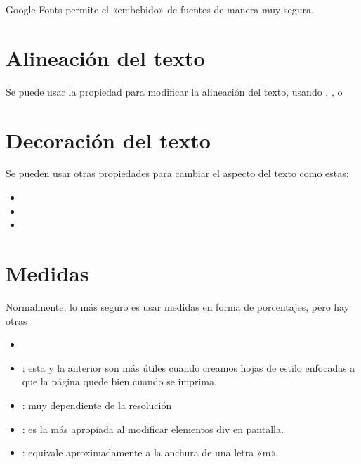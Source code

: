 \documentclass[letterpaper,10pt,spanish]{sphinxmanual}
\begin{document}
Google Fonts permite el «embebido» de fuentes de manera muy segura.


\section{Alineación del texto}
\label{\detokenize{tema3:alineacion-del-texto}}
Se puede usar la propiedad  para modificar la alineación del texto, usando , ,  o 


\section{Decoración del texto}
\label{\detokenize{tema3:decoracion-del-texto}}
Se pueden usar otras propiedades para cambiar
el aspecto del texto como estas:
\begin{itemize}
\item {} 

\item {} 

\item {} 

\end{itemize}


\section{Medidas}
\label{\detokenize{tema3:medidas}}
Normalmente, lo más seguro es usar medidas en forma de porcentajes, pero hay otras
\begin{itemize}
\item {} 

\item {} 
: esta y la anterior son más útiles cuando creamos hojas de estilo enfocadas a que la página quede bien cuando se imprima.

\item {} 
: muy dependiente de la resolución

\item {} 
: es la más apropiada al modificar elementos div en pantalla.

\item {} 
: equivale aproximadamente a la anchura de una letra «m».

\end{itemize}
\end{document}
